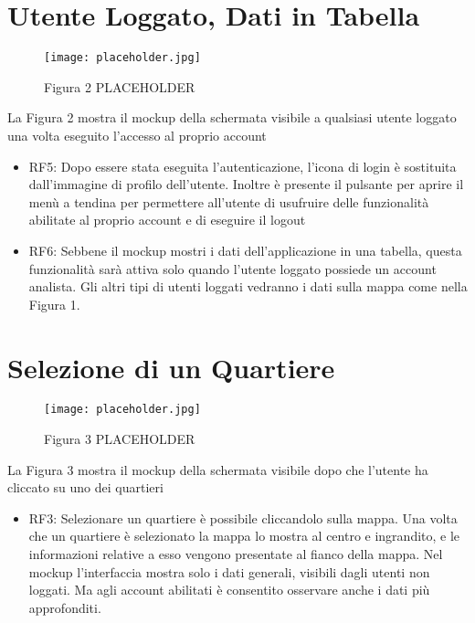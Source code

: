 \section{Utente Loggato, Dati in Tabella}

    \begin{figure}[H]
        \center
        \texttt{[image: placeholder.jpg]} %
        \caption{Figura 2 PLACEHOLDER}
    \end{figure}    

    La Figura 2 mostra il mockup della schermata visibile a qualsiasi utente loggato una volta eseguito l'accesso al proprio account

    \begin{itemize}
        \item RF5: Dopo essere stata eseguita l'autenticazione, l'icona di login è sostituita dall'immagine di profilo dell'utente. Inoltre è presente il pulsante per aprire il menù a tendina per permettere all'utente di usufruire delle funzionalità abilitate al proprio account e di eseguire il logout
        \item RF6: Sebbene il mockup mostri i dati dell'applicazione in una tabella, questa funzionalità sarà attiva solo quando l'utente loggato possiede un account analista. Gli altri tipi di utenti loggati vedranno i dati sulla mappa come nella Figura 1.
    \end{itemize}




\section{Selezione di un Quartiere}

    \begin{figure}[H]
        \center
        \texttt{[image: placeholder.jpg]} %
        \caption{Figura 3 PLACEHOLDER}
    \end{figure}    

    La Figura 3 mostra il mockup della schermata visibile dopo che l'utente ha cliccato su uno dei quartieri

    \begin{itemize}
        \item RF3: Selezionare un quartiere è possibile cliccandolo sulla mappa. Una volta che un quartiere è selezionato la mappa lo mostra al centro e ingrandito, e le informazioni relative a esso vengono presentate al fianco della mappa. Nel mockup l'interfaccia mostra solo i dati generali, visibili dagli utenti non loggati. Ma agli account abilitati è consentito osservare anche i dati più approfonditi.
    \end{itemize}


